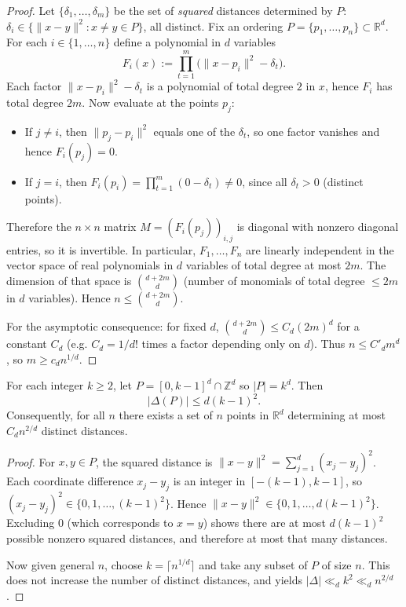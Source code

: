 \begin{proof}
Let \(\{\delta_1,\dots,\delta_m\}\) be the set of \emph{squared} distances determined by \(P\):
\(\delta_i\in \{\|x-y\|^2: x\ne y\in P\}\), all distinct.
Fix an ordering \(P=\{p_1,\dots,p_n\}\subset\mathbb{R}^d\).
For each \(i\in\{1,\dots,n\}\) define a polynomial in \(d\) variables
\[
F_i(x):=\prod_{t=1}^m \big(\|x-p_i\|^2-\delta_t\big).
\]
Each factor \(\|x-p_i\|^2-\delta_t\) is a polynomial of total degree \(2\) in \(x\), hence \(F_i\) has total degree \(2m\).
Now evaluate at the points \(p_j\):
\begin{itemize}
\item If \(j\ne i\), then \(\|p_j-p_i\|^2\) equals one of the \(\delta_t\), so one factor vanishes and hence \(F_i(p_j)=0\).
\item If \(j=i\), then \(F_i(p_i)=\prod_{t=1}^m(0-\delta_t)\ne 0\), since all \(\delta_t>0\) (distinct points).
\end{itemize}
Therefore the \(n\times n\) matrix \(M=(F_i(p_j))_{i,j}\) is diagonal with nonzero diagonal entries, so it is invertible.
In particular, \(F_1,\dots,F_n\) are linearly independent in the vector space of real polynomials in \(d\) variables of total degree at most \(2m\).
The dimension of that space is \(\binom{d+2m}{d}\) (number of monomials of total degree \(\le 2m\) in \(d\) variables).
Hence \(n\le \binom{d+2m}{d}\).

For the asymptotic consequence: for fixed \(d\),
\(\binom{d+2m}{d}\le C_d (2m)^d\) for a constant \(C_d\) (e.g. \(C_d=1/d!\) times a factor depending only on \(d\)). Thus
\(n\le C'_d m^d\), so \(m\ge c_d n^{1/d}\).
\end{proof}

\begin{lemma}
For each integer \(k\ge 2\), let \(P=[0,k-1]^d\cap \mathbb{Z}^d\) so \(|P|=k^d\). Then
\[
|\Delta(P)|\le d(k-1)^2.
\]
Consequently, for all \(n\) there exists a set of \(n\) points in \(\mathbb{R}^d\) determining at most \(C_d n^{2/d}\) distinct distances.
\end{lemma}

\begin{proof}
For \(x,y\in P\), the squared distance is
\(\|x-y\|^2=\sum_{j=1}^d (x_j-y_j)^2\).
Each coordinate difference \(x_j-y_j\) is an integer in \([-(k-1),k-1]\), so \((x_j-y_j)^2\in\{0,1,\dots,(k-1)^2\}\). Hence
\(\|x-y\|^2\in\{0,1,\dots,d(k-1)^2\}\).
Excluding \(0\) (which corresponds to \(x=y\)) shows there are at most \(d(k-1)^2\) possible nonzero squared distances, and therefore at most that many distances.

Now given general \(n\), choose \(k=\lceil n^{1/d}\rceil\) and take any subset of \(P\) of size \(n\). This does not increase the number of distinct distances, and yields
\(|\Delta|\ll_d k^2\ll_d n^{2/d}\).
\end{proof}

